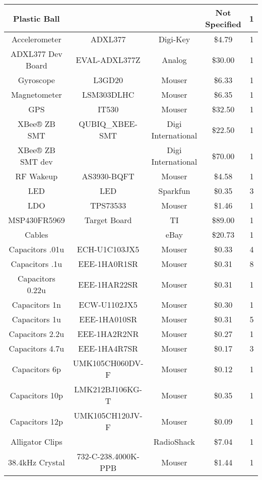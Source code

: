 \begin{center}
\begin{longtable}{|c|c|c|c|c|}
    Plastic Ball &       &       & Not Specified & 1 \\ \hline
    Accelerometer & ADXL377 & Digi-Key & \$4.79  & 1 \\ \hline
    ADXL377 Dev Board & EVAL-ADXL377Z & Analog & \$30.00  & 1 \\ \hline
    Gyroscope & L3GD20 & Mouser & \$6.33  & 1 \\ \hline
    Magnetometer & LSM303DLHC & Mouser & \$6.35  & 1 \\ \hline
    GPS   & IT530 & Mouser & \$32.50  & 1 \\ \hline
    XBee® ZB SMT & QUBIQ\_XBEE-SMT & Digi International & \$22.50  & 1 \\ \hline
    XBee® ZB SMT dev &       & Digi International & \$70.00  & 1 \\ \hline
    RF Wakeup & AS3930-BQFT & Mouser & \$4.58  & 1 \\ \hline
    LED   & LED   & Sparkfun & \$0.35  & 3 \\ \hline
    LDO   & TPS73533 & Mouser & \$1.46  & 1 \\ \hline
    MSP430FR5969 & Target Board & TI & \$89.00  & 1 \\ \hline
    Cables &       & eBay  & \$20.73  & 1 \\ \hline
    Capacitors .01u & ECH-U1C103JX5 & Mouser & \$0.33  & 4 \\ \hline
    Capacitors .1u & EEE-1HA0R1SR & Mouser & \$0.31  & 8 \\ \hline
    Capacitors 0.22u & EEE-1HAR22SR & Mouser & \$0.31  & 1 \\ \hline
    Capacitors 1n & ECW-U1102JX5 & Mouser & \$0.30  & 1 \\ \hline
    Capacitors 1u & EEE-1HA010SR & Mouser & \$0.31  & 5 \\ \hline
    Capacitors 2.2u & EEE-1HA2R2NR & Mouser & \$0.27  & 1 \\ \hline
    Capacitors 4.7u & EEE-1HA4R7SR & Mouser & \$0.17  & 3 \\ \hline
    Capacitors 6p & UMK105CH060DV-F & Mouser & \$0.12  & 1 \\ \hline
    Capacitors 10p & LMK212BJ106KG-T & Mouser & \$0.35  & 1 \\ \hline
    Capacitors 12p & UMK105CH120JV-F & Mouser & \$0.09  & 1 \\ \hline
    Alligator Clips &       & RadioShack &    \$7.04   &1\\ \hline
    38.4kHz Crystal & 732-C-238.4000K-PPB & Mouser & \$1.44  & 1 \\ \hline

\end{longtable}
\end{center}
